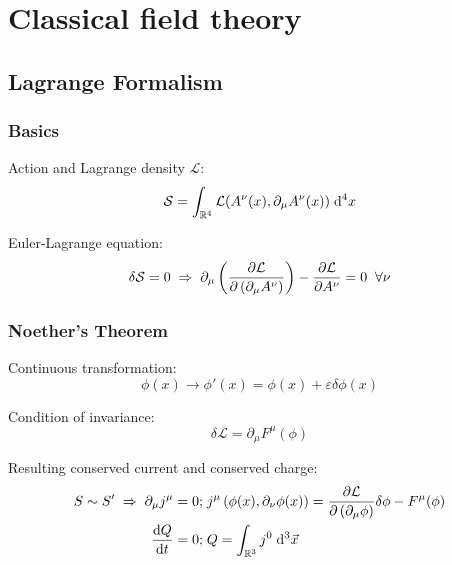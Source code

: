 \section{Classical field theory}
	\subsection{Lagrange Formalism}
		\subsubsection{Basics}
			\noindent
			Action and Lagrange density $\mathcal{L}$:
			\begin{equation}
				\mathcal{S} = \int_{\mathbb{R}^4} \mathcal{L}(A^\nu(x),\partial_\mu A^\nu(x)) \;\mathrm{d}^4 x
			\end{equation}

			\noindent
			Euler-Lagrange equation:
			\begin{equation}
				\delta\mathcal{S} = 0
				\;\Rightarrow\; \partial_\mu \left(\frac{\partial \mathcal{L}}{\partial \left(\partial_\mu A^\nu\right)}\right) - \frac{\partial \mathcal{L}}{\partial A^\nu} = 0 \;\;\forall \nu
			\end{equation}

		\subsubsection{Noether's Theorem}
			\noindent
			Continuous transformation:%
			\begin{equation}
				\phi(x)\rightarrow\phi'(x) = \phi(x) + \varepsilon \delta \phi(x)
			\end{equation}

			\noindent
			Condition of invariance:%
			\begin{equation}
				\delta\mathcal{L} = \partial_\mu F^\mu(\phi)
			\end{equation}

			\noindent
			Resulting conserved current and conserved charge:%
			\begin{equation}
				\begin{aligned}
					S \sim S' \;\Rightarrow\;\partial_\mu j^\mu = 0;&\; j^\mu \left( \phi(x), \partial_\nu\phi(x) \right) = \frac{\partial \mathcal{L}}{\partial \left(\partial_\mu \phi\right)}\delta\phi - F^\mu(\phi) \\
					\frac{\mathrm{d} Q}{\mathrm{d} t} = 0;&\; Q = \int_{\mathbb{R}^3} j^0\;\mathrm{d}^3\vec{x}
				\end{aligned}
			\end{equation}
